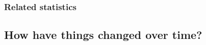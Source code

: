 \documentclass{ar-1col}
\newcommand{\todo}[1]{{\textbf{\color{red}{#1}}}}
\begin{document}

%
%        
%
%
%
%



\subsubsection{Related statistics}

\todo{Fst, various IBD-metrics?}
%

\subsection{How have things changed over time?}
\end{document}

